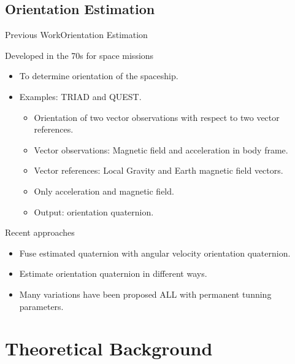 \documentclass[10pt,aspectratio=1610]{beamer}
\begin{document}
\subsection{Orientation Estimation}
\label{subsec:orientation_estimation}
\begin{frame}{Previous Work}{Orientation Estimation}
\begin{block}{Developed in the 70s for space missions}
	\begin{itemize}
		\item To determine orientation of the spaceship.
		\item Examples: TRIAD and QUEST.
		\begin{itemize}
			\item Orientation of two vector observations with respect to two vector references.
			\item Vector observations: Magnetic field and acceleration in body frame.
			\item Vector references: Local Gravity and Earth magnetic field vectors.
			\item Only acceleration and magnetic field.
			\item Output: orientation quaternion.
		\end{itemize}
	\end{itemize}	
\end{block}
\begin{block}{Recent approaches}
\begin{itemize}
	\item Fuse estimated quaternion with angular velocity orientation quaternion.
	\item Estimate orientation quaternion in different ways.
	\item Many variations have been proposed ALL with permanent tunning parameters.
\end{itemize}
\end{block}
\end{frame}


\section{Theoretical Background}
\label{sec:theory}
\end{document}
